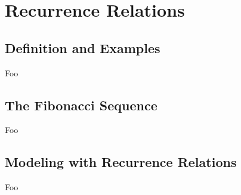 \section{Recurrence Relations}

\subsection{Definition and Examples}

Foo

\subsection{The Fibonacci Sequence}

Foo

\subsection{Modeling with Recurrence Relations}

Foo

